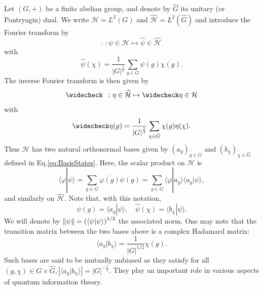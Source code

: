 \documentclass[a4paper, notitlepage, 11pt]{article}
\numberwithin{equation}{section}
\newcommand{\bracket}[2]{\langle #1 | #2\rangle}
\newcommand{\mcl}[1]{\ensuremath{\mathcal{#1}}}
\newcommand{\Hcal}{{\mcl H}}
\newcommand{\card}[1]{\left|#1\right|}
\begin{document}
Let $(G,+)$ be a finite abelian group, and denote by $\hat G$ its unitary (or Pontryagin) dual. We write $\Hcal=L^2(G)$ and $\widehat\Hcal=L^2(\widehat G)$ and introduce the Fourier transform by
\begin{equation}
\widehat\ \ \colon \psi\in\Hcal\mapsto\widehat\psi\in\widehat\Hcal
\end{equation}
with
\begin{equation}
\widehat\psi(\chi)=\frac1{|G|^{\frac{1}{2}}}\sum_{g\in G}\psi(g)\overline{\chi(g)}.
\end{equation}
The inverse Fourier transform is then given by
\begin{equation}
\widecheck\ \ \colon \eta\in \widehat\Hcal\mapsto \widecheck \eta\in \Hcal
\end{equation}
with
\begin{equation}
\widecheck \eta(g)=\frac{1}{\left|G\right|^{\frac{1}{2}}}\sum_{\chi\in \hat{G}}\chi(g)\eta(\chi).
\end{equation}
Thus $\Hcal$ has two natural orthonormal bases given by $(a_{g})_{g\in G}$ and $(b_{\chi})_{\chi\in \widehat{G}}$ defined in Eq.\eqref{eq:BasisStates}.
Here, the scalar product on $\Hcal$ is
$$
\bracket{\varphi}{\psi} = \sum_{g\in G} \overline{\varphi(g)}\psi(g)=\sum_{g\in G} \bracket{\varphi}{a_g}\bracket{a_g}{ \psi},
$$
and similarly on $\widehat\Hcal$. Note that, with this notation,
\begin{equation}
\psi(g)=\bracket{a_g}{\psi},\quad \widehat\psi(\chi)=\bracket{b_\chi}{\psi}.
\end{equation}
We will denote by $\norm{\psi} = \left(\bracket{\psi}{\psi}\right)^{1/2}$ the associated norm. One may note that the transition matrix between the two bases above is a complex Hadamard matrix:
\begin{equation}
\bracket{a_g}{b_\chi} =\frac1{|G|^{1/2}}\chi(g).
\end{equation}
Such bases are said to be mutually unbiased as they satisfy for all $(g,\chi)\in G\times \hat{G}, \left|\bracket{a_g}{b_\chi}\right| = \card{G}^{-\frac{1}{2}}$. They play an important role in various aspects of quantum information theory.
\end{document}
